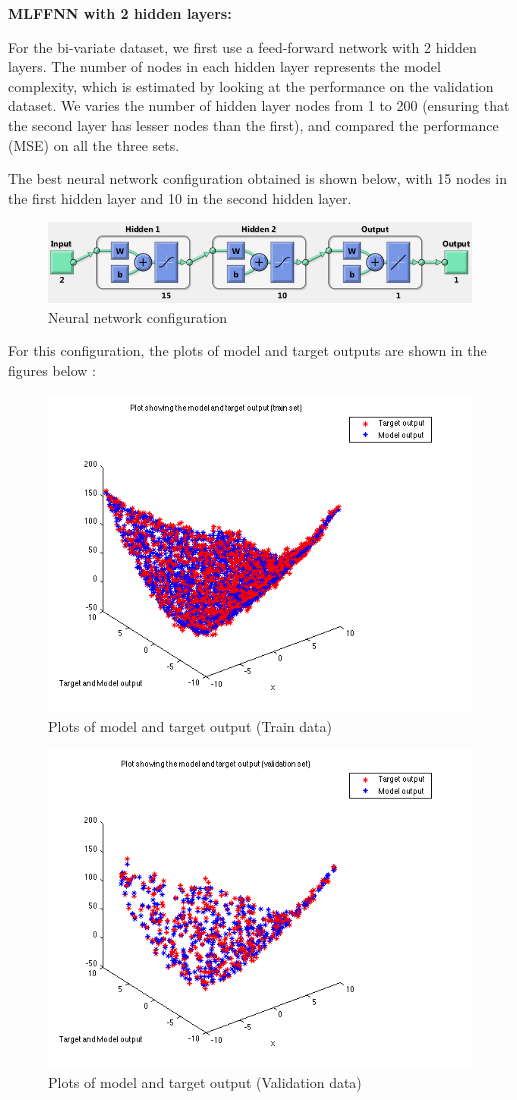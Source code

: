 \documentclass{article}
\begin{document}
\textbf{MLFFNN with 2 hidden layers:}

For the bi-variate dataset, we first use a feed-forward network with 2 hidden layers. The number of nodes in each hidden layer represents the model complexity, which is estimated by looking at the performance on the validation dataset. We varies the number of hidden layer nodes from 1 to 200 (ensuring that the second layer has lesser nodes than the first), and compared the performance (MSE) on all the three sets. 

The best neural network configuration obtained is shown below, with 15 nodes in the first hidden layer and 10 in the second hidden layer.

\begin{figure}[H]
\centering
\includegraphics[width=\linewidth]{Regression/bivariate/net_config_2.png}
\caption{Neural network configuration}
\end{figure}

For this configuration, the plots of model and target outputs are shown in the figures below : 

\begin{figure}[H]
\centering
\includegraphics[width=0.5\linewidth]{Regression/bivariate/output_2layer_train.png}
\caption{Plots of model and target output (Train data)}
\end{figure}

\begin{figure}[H]
\centering
\includegraphics[width=0.5\linewidth]{Regression/bivariate/output_2layer_val.png}
\caption{Plots of model and target output (Validation data)}
\end{figure}
\end{document}
